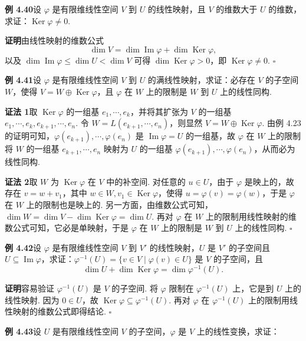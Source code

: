 \documentclass[UTF8, 12pt, fontset=fandol, oneside]{ctexart}
\begin{document}
\noindent\textbf{例 4.40}\quad 设 $\varphi$ 是有限维线性空间 $V$ 到 $U$ 的线性映射，且 $V$ 的维数大于 $U$ 的维数，求证：$\operatorname{Ker}\varphi\ne0$.

\noindent\textbf{证明}\quad 由线性映射的维数公式
\[
\dim V=\dim\operatorname{Im}\varphi+\dim\operatorname{Ker}\varphi,
\]
以及 $\dim\operatorname{Im}\varphi\le\dim U<\dim V$ 可得 $\dim\operatorname{Ker}\varphi>0$，即 $\operatorname{Ker}\varphi\ne0$. $\square$

\noindent\textbf{例 4.41}\quad 设 $\varphi$ 是有限维线性空间 $V$ 到 $U$ 的满线性映射，求证：必存在 $V$ 的子空间 $W$，使得 $V=W\oplus\operatorname{Ker}\varphi$，且 $\varphi$ 在 $W$ 上的限制是 $W$ 到 $U$ 上的线性同构.

\noindent\textbf{证法 1}\quad 取 $\operatorname{Ker}\varphi$ 的一组基 $e_1,\cdots,e_k$，并将其扩张为 $V$ 的一组基 $e_1,\cdots,e_k,e_{k+1},\cdots,e_n$. 令 $W=L(e_{k+1},\cdots,e_n)$，则显然 $V=W\oplus\operatorname{Ker}\varphi$. 由例 4.23 的证明可知，$\varphi(e_{k+1}),\cdots,\varphi(e_n)$ 是 $\operatorname{Im}\varphi=U$ 的一组基，故 $\varphi$ 在 $W$ 上的限制将 $W$ 的一组基 $e_{k+1},\cdots,e_n$ 映射为 $U$ 的一组基 $\varphi(e_{k+1}),\cdots,\varphi(e_n)$，从而必为线性同构.

\noindent\textbf{证法 2}\quad 取 $W$ 为 $\operatorname{Ker}\varphi$ 在 $V$ 中的补空间. 对任意的 $u\in U$，由于 $\varphi$ 是映上的，故存在 $v=w+v_1$，其中 $w\in W,v_1\in\operatorname{Ker}\varphi$，使得 $u=\varphi(v)=\varphi(w)$，于是 $\varphi$ 在 $W$ 上的限制也是映上的. 另一方面，由维数公式可知，$\dim W=\dim V-\dim\operatorname{Ker}\varphi=\dim U$. 再对 $\varphi$ 在 $W$ 上的限制用线性映射的维数公式可知，它必是单映射，于是 $\varphi$ 在 $W$ 上的限制是 $W$ 到 $U$ 上的线性同构. $\square$

\noindent\textbf{例 4.42}\quad 设 $\varphi$ 是有限维线性空间 $V$ 到 $V'$ 的线性映射，$U$ 是 $V'$ 的子空间且 $U\subseteq\operatorname{Im}\varphi$，求证：$\varphi^{-1}(U)=\{v\in V\mid \varphi(v)\in U\}$ 是 $V$ 的子空间，且
\[
\dim U+\dim\operatorname{Ker}\varphi=\dim\varphi^{-1}(U).
\]

\noindent\textbf{证明}\quad 容易验证 $\varphi^{-1}(U)$ 是 $V$ 的子空间. 将 $\varphi$ 限制在 $\varphi^{-1}(U)$ 上，它是到 $U$ 上的线性映射. 因为 $0\in U$，故 $\operatorname{Ker}\varphi\subseteq\varphi^{-1}(U)$. 再对 $\varphi$ 在 $\varphi^{-1}(U)$ 上的限制用线性映射的维数公式即得结论. $\square$

\noindent\textbf{例 4.43}\quad 设 $U$ 是有限维线性空间 $V$ 的子空间，$\varphi$ 是 $V$ 上的线性变换，求证：
\end{document}
